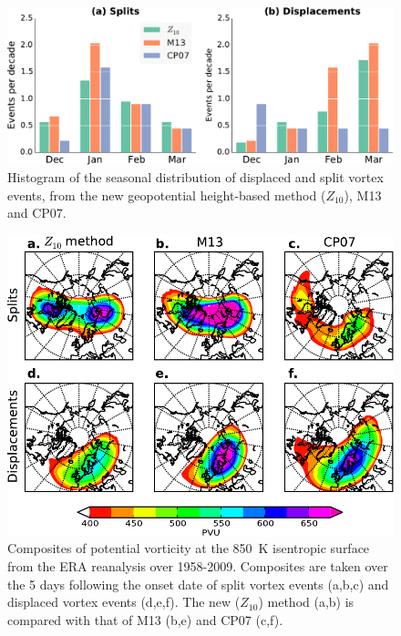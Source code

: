 \begin{figure}
  \centering
  \noindent\includegraphics[width=\textwidth]{figures/chapter-moments/splits_displacements_histogram.pdf}
  \caption[Seasonal distribution of displaced and split vortex
  events.]{Histogram of the seasonal distribution of displaced and split vortex
    events, from the new geopotential height-based method ($Z_{10}$), M13 and
    CP07.}
  \label{fig:z_m13_cp07_histogram}
\end{figure}

\begin{figure}
 \centering
 \noindent\includegraphics[width=\textwidth]{figures/chapter-moments/pv_composites_colbar_crop.pdf}
 \caption[PV composites for split and displaced vortex events.]{Composites of
   potential vorticity at the 850~K isentropic surface from the ERA reanalysis
   over 1958-2009. Composites are taken over the 5 days following the onset date
   of split vortex events (a,b,c) and displaced vortex events (d,e,f). The
   new ($Z_{10}$) method (a,b) is compared with that of M13 (b,e) and CP07
   (c,f).}
 \label{fig:pv_composites_m13_cp07}
\end{figure}

